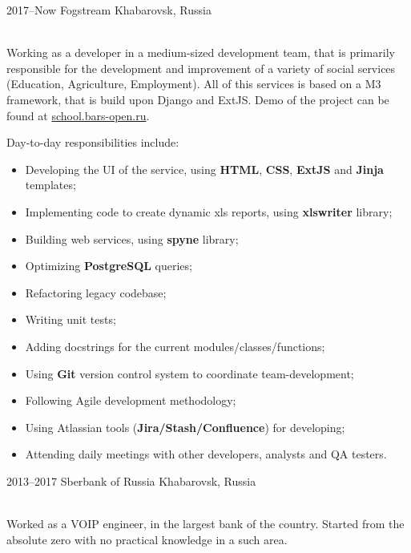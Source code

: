 \documentclass[]{cv-style}
\begin{document}
\begin{entrylist}
\entry
  {2017--Now}
  {Fogstream}
  {Khabarovsk, Russia}
  {\\
  Working as a developer in a medium-sized development team, that is primarily %
  responsible for the development and improvement of a variety of social services
  (Education, Agriculture, Employment). All of this services is based on a M3 framework,
  that is build upon Django and ExtJS. Demo of the project can be found
  at \href{http://school.bars-open.ru}{school.bars-open.ru}.

  Day-to-day responsibilities include:
  \begin{itemize}
      \item Developing the UI of the service, using \textbf{HTML}, \textbf{CSS}, \textbf{ExtJS} and \textbf{Jinja} templates;
      \item Implementing code to create dynamic xls reports, using \textbf{xlswriter} library;
      \item Building web services, using \textbf{spyne} library;
      \item Optimizing \textbf{PostgreSQL} queries;
      \item Refactoring legacy codebase;
      \item Writing unit tests;
      \item Adding docstrings for the current modules/classes/functions;
      \item Using \textbf{Git} version control system to coordinate team-development;
      \item Following Agile development methodology;
      \item Using Atlassian tools (\textbf{Jira/Stash/Confluence}) for developing;
      \item Attending daily meetings with other developers, analysts and QA testers.
  \end{itemize}}
\entry
  {2013--2017}
  {Sberbank of Russia}
  {Khabarovsk, Russia}
  {\\
  Worked as a VOIP engineer, in the largest bank of the country. Started from the absolute zero with no practical knowledge in a such area.

}
\end{entrylist}
\end{document}
